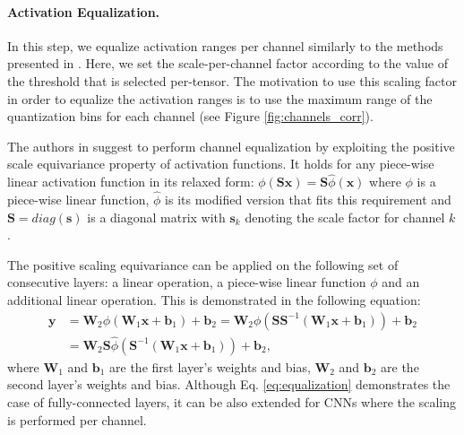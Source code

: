 \documentclass{article}
\newcommand{\vectorsym}[1]{\bm{#1}}
\newcommand{\brackets}[1]{\left(#1\right)}
\newcommand{\matsym}[1]{\mathbf{#1}}
\begin{document}
\paragraph{Activation Equalization.} 
In this step, we equalize activation ranges per channel similarly to the methods presented in \cite{nagel2019data,meller2019same}. 
Here, we set the scale-per-channel factor according to the value of the threshold that is selected per-tensor. The motivation to use this scaling factor in order to equalize the activation ranges is to use the maximum range of the quantization bins for each channel (see Figure \ref{fig:channels_corr}).



The authors in \cite{nagel2019data, meller2019same} suggest to perform channel equalization by exploiting the positive scale equivariance property of activation functions. 
It holds for any piece-wise linear activation function in its relaxed form:
${\phi}\brackets{\vectorsym{S}\vectorsym{x}}=\vectorsym{S}\hat{\phi}\brackets{\vectorsym{x}}$
where $\phi$ is a piece-wise linear function, $\hat{\phi}$ is its modified version that fits this requirement and $\vectorsym{S}=diag\brackets{\vectorsym{s}}$ is a diagonal matrix with $\vectorsym{s}_{k}$ denoting the scale factor for channel $k$.

The positive scaling equivariance can be applied on the following set of consecutive layers: a linear operation, a piece-wise linear function $\phi$ and an additional linear operation. This is demonstrated in the following equation:
\begin{equation}\label{eq:equalization}
\begin{split}
    \matsym{y} &=\matsym{W}_2\phi\brackets{\matsym{W}_1\matsym{x}+\vectorsym{b}_1}+\vectorsym{b}_2=\matsym{W}_2\phi\brackets{{\vectorsym{S}}{\vectorsym{S}^{-1}}\brackets{\matsym{W}_1 \matsym{x}+\vectorsym{b}_1}}+\vectorsym{b}_2\\
    &= \matsym{W}_2\vectorsym{S}\hat{\phi}({\vectorsym{S}^{-1}}\brackets{\matsym{W}_1 \matsym{x}+\vectorsym{b}_1})+\vectorsym{b}_2,
\end{split}
\end{equation}
where $\matsym{W}_1$ and $\vectorsym{b}_1$ are the first layer's weights and bias, $\matsym{W}_2$ and $\vectorsym{b}_2$ are the second layer's  weights and bias. Although Eq. \ref{eq:equalization}  demonstrates the case of fully-connected layers, it can be also extended for CNNs where the scaling is performed per channel.
\end{document}
